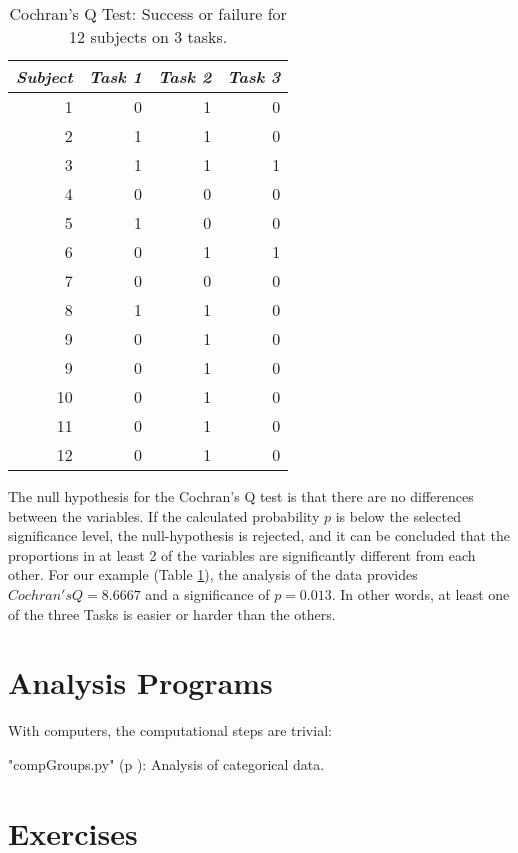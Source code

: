 \begin{table}
  \centering
  \begin{tabular}{|r|r r r|}
  \hline
  \emph{Subject}& \emph{Task 1} & \emph{Task 2} & \emph{Task 3} \\
  \hline
  1  & 0 & 1 & 0 \\
  2  & 1 & 1 & 0 \\
  3  & 1 & 1 & 1 \\
  4  & 0 & 0 & 0 \\
  5  & 1 & 0 & 0 \\
  6  & 0 & 1 & 1 \\
  7  & 0 & 0 & 0 \\
  8  & 1 & 1 & 0 \\
  9  & 0 & 1 & 0 \\
  9  & 0 & 1 & 0 \\
  10 & 0 & 1 & 0 \\
  11 & 0 & 1 & 0 \\
  12 & 0 & 1 & 0 \\
  \hline
  \end{tabular}

  \caption{Cochran's Q Test: Success or failure for 12 subjects on 3 tasks.}\label{table:CochransQ}
\end{table}

The null hypothesis for the Cochran's Q test is that there are no differences between the variables. If the calculated probability $p$ is below the selected significance level, the null-hypothesis is rejected, and it can be concluded that the proportions in at least 2 of the variables are significantly different from each other. For our example (Table \ref{table:CochransQ}), the analysis of the data provides $Cochran's Q = 8.6667$ and a significance of $p = 0.013$. In other words, at least one of the three Tasks is easier or harder than the others.

\section{Analysis Programs}

With computers, the computational steps are trivial:

\PyImg "compGroups.py" (p \pageref{py:compGroups}): Analysis of categorical data.

\section{Exercises}

